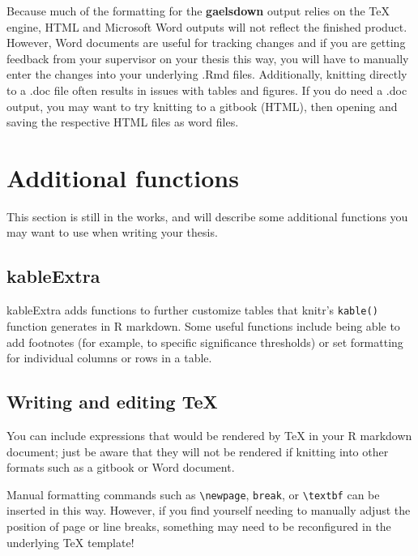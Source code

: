 \documentclass[12pt, oneside]{queensuthesis}
\numberwithin{equation}{chapter}       %
\begin{document}
Because much of the formatting for the \textbf{gaelsdown} output relies on the TeX engine, HTML and Microsoft Word outputs will not reflect the finished product. However, Word documents are useful for tracking changes and if you are getting feedback from your supervisor on your thesis this way, you will have to manually enter the changes into your underlying .Rmd files. Additionally, knitting directly to a .doc file often results in issues with tables and figures. If you do need a .doc output, you may want to try knitting to a gitbook (HTML), then opening and saving the respective HTML files as word files.

\hypertarget{additional-functions}{%
\chapter{Additional functions}\label{additional-functions}}

This section is still in the works, and will describe some additional functions you may want to use when writing your thesis.

\hypertarget{kableextra}{%
\section{kableExtra}\label{kableextra}}

kableExtra adds functions to further customize tables that knitr's \texttt{kable()}
function generates in R markdown. Some useful functions include being able to
add footnotes (for example, to specific significance thresholds) or set
formatting for individual columns or rows in a table.

\hypertarget{writing-and-editing-tex}{%
\section{Writing and editing TeX}\label{writing-and-editing-tex}}

You can include expressions that would be rendered by TeX in your R markdown
document; just be aware that they will not be rendered if knitting into
other formats such as a gitbook or Word document.

Manual formatting commands such as \texttt{\textbackslash{}newpage}, \texttt{break}, or \texttt{\textbackslash{}textbf} can be
inserted in this way. However, if you find yourself needing to manually adjust
the position of page or line breaks, something may need to be reconfigured in
the underlying TeX template!
\end{document}

